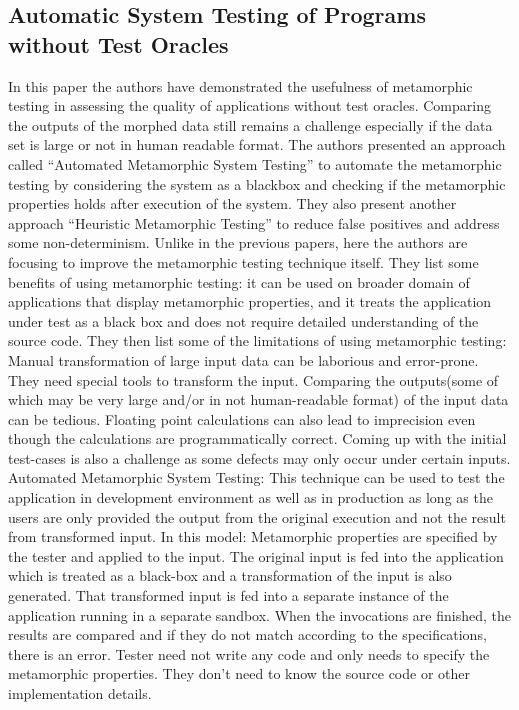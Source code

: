 	\subsection{Automatic System Testing of Programs without Test Oracles}
		In this paper the authors have demonstrated the usefulness of metamorphic testing in assessing the quality of applications without test oracles. Comparing the outputs of the morphed data still remains a challenge especially if the data set is large or not in human readable format. The authors presented an approach called ``Automated Metamorphic System Testing'' to automate the metamorphic testing by considering the system as a blackbox and checking if the metamorphic properties holds after execution of the system. They also present another approach “Heuristic Metamorphic Testing” to reduce false positives and address some non-determinism. Unlike in the previous papers, here the authors are focusing to improve the metamorphic testing technique itself. They list some benefits of using metamorphic testing: it can be used on broader domain of applications that display metamorphic properties, and it treats the application under test as a black box and does not require detailed understanding of the source code. They then list some of the limitations of using metamorphic testing:
		Manual transformation of large input data can be laborious and error-prone. They need special tools to transform the input.
		Comparing the outputs(some of which may be very large and/or in not human-readable format) of the input data can be tedious.
		Floating point calculations can also lead to imprecision even though the calculations are programmatically correct.
		Coming up with the initial test-cases is also a challenge as some defects may only occur under certain inputs.
		Automated Metamorphic System Testing: This technique can be used to test the application in development environment as well as in production as long as the users are only provided the output from the original execution and not the result from transformed input. In this model:
		Metamorphic properties are specified by the tester and applied to the input.
		The original input is fed into the application which is treated as a black-box and a transformation of the input is also generated.
		That transformed input is fed into a separate instance of the application running in a separate sandbox.
		When the invocations are finished, the results are compared and if they do not match according to the specifications, there is an error.
		Tester need not write any code and only needs to specify the metamorphic properties. They don’t need to know the source code or other implementation details.
